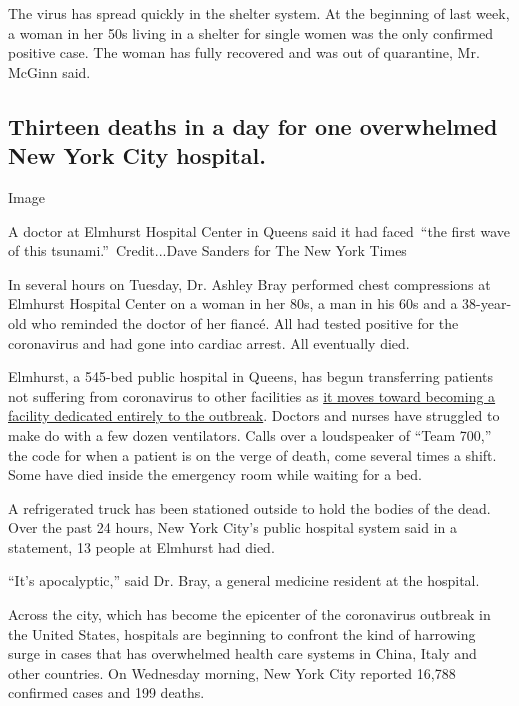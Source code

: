 The virus has spread quickly in the shelter system. At the beginning of
last week, a woman in her 50s living in a shelter for single women was
the only confirmed positive case. The woman has fully recovered and was
out of quarantine, Mr. McGinn said.

\hypertarget{thirteen-deaths-in-a-day-for-one-overwhelmed-new-york-city-hospital}{%
\subsection{Thirteen deaths in a day for one overwhelmed New York City
hospital.}\label{thirteen-deaths-in-a-day-for-one-overwhelmed-new-york-city-hospital}}

Image

A doctor at Elmhurst Hospital Center in Queens said it had faced~``the
first wave of this tsunami.''~Credit...Dave Sanders for The New York
Times

In several hours on Tuesday, Dr. Ashley Bray performed chest
compressions at Elmhurst Hospital Center on a woman in her 80s, a man in
his 60s and a 38-year-old who reminded the doctor of her fiancé. All had
tested positive for the coronavirus and had gone into cardiac arrest.
All eventually died.

Elmhurst, a 545-bed public hospital in Queens, has begun transferring
patients not suffering from coronavirus to other facilities as
\href{https://www.nytimes3xbfgragh.onion/2020/03/25/nyregion/nyc-coronavirus-hospitals.html}{it
moves toward becoming a facility dedicated entirely to the outbreak}.
Doctors and nurses have struggled to make do with a few dozen
ventilators. Calls over a loudspeaker of ``Team 700,'' the code for when
a patient is on the verge of death, come several times a shift. Some
have died inside the emergency room while waiting for a bed.

A refrigerated truck has been stationed outside to hold the bodies of
the dead. Over the past 24 hours, New York City's public hospital system
said in a statement, 13 people at Elmhurst had died.

``It's apocalyptic,'' said Dr. Bray, a general medicine resident at the
hospital.

Across the city, which has become the epicenter of the coronavirus
outbreak in the United States, hospitals are beginning to confront the
kind of harrowing surge in cases that has overwhelmed health care
systems in China, Italy and other countries. On Wednesday morning, New
York City reported 16,788 confirmed cases and 199 deaths.

